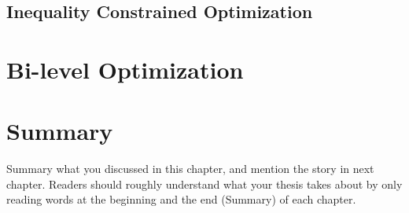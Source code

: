 \subsection{Inequality Constrained Optimization}

\section{Bi-level Optimization}
\label{sec:bilevel}



\section{Summary}
\label{sec:2summary}
Summary what you discussed in this chapter, and mention the story in next
chapter. Readers should roughly understand what your thesis takes about by only reading
words at the beginning and the end (Summary) of each chapter.



